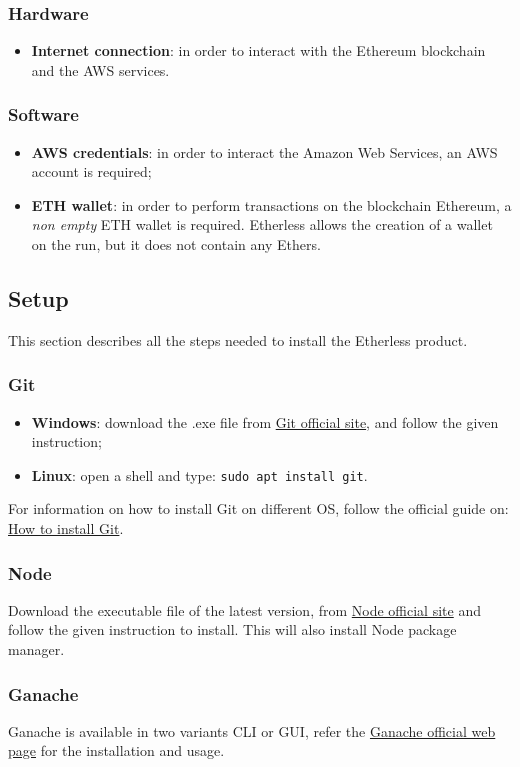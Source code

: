 \subsubsection{Hardware}
\begin{itemize}
	\item \textbf{Internet connection}: in order to interact with the Ethereum blockchain and the AWS services.
\end{itemize}
\subsubsection{Software}
\begin{itemize}
	\item \textbf{AWS credentials}: in order to interact the Amazon Web Services, an AWS account is required;
	\item \textbf{ETH wallet}: in order to perform transactions on the blockchain Ethereum, a \textit{non empty} ETH wallet is required. Etherless allows the creation of a wallet on the run, but it does not contain any Ethers.
\end{itemize}
\subsection{Setup}
This section describes all the steps needed to install the Etherless product.
\subsubsection{Git}
\begin{itemize}
	\item \textbf{Windows}: download the .exe file from \href{https://git-scm.com/download/win}{Git official site}, and follow the given instruction;
	\item \textbf{Linux}: open a shell and type: \texttt{sudo apt install git}.
\end{itemize}
	For information on how to install Git on different OS, follow the official guide on: \href{https://git-scm.com/book/en/v2/Getting-Started-Installing-Git}{How to install Git}.
\subsubsection{Node}
	Download the executable file of the latest version, from \href{https://nodejs.org/it/download/}{Node official site} and follow the given instruction to install. This will also install Node package manager.
\subsubsection{Ganache}
	Ganache is available in two variants CLI or GUI, refer the \href{https://www.trufflesuite.com/docs/ganache/quickstart}{Ganache official web page} for the installation and usage.
